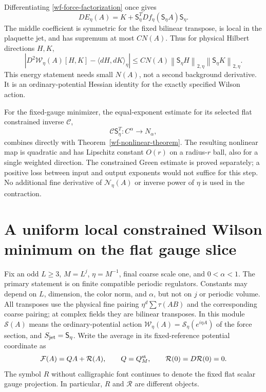 \documentclass[11pt]{article}
\theoremstyle{remark}
\newcommand{\norm}[1]{\left\|#1\right\|}
\begin{document}
Differentiating \eqref{wf-force-factorization} once gives
\begin{equation}\label{wf-energy-Hessian}
 DE_\eta(A)=K+\mathsf S_\eta^T
                Df_\eta(\mathsf S_\eta A)\mathsf S_\eta.
\end{equation}
The middle coefficient is symmetric for the fixed bilinear
transpose, is local in the plaquette jet, and has supremum
at most $CN(A)$. Thus for physical Hilbert directions $H,K$,
\begin{equation}\label{wf-energy-form}
 \left|D^2\mathcal W_\eta(A)[H,K]
                         -\langle dH,dK\rangle_\eta\right|
 \le CN(A)\norm{\mathsf S_\eta H}_{2,\eta}
                         \norm{\mathsf S_\eta K}_{2,\eta}.
\end{equation}
This energy statement needs small $N(A)$, not a second
background derivative. It is an ordinary-potential
Hessian identity for the exactly specified Wilson action.

For the fixed-gauge minimizer, the equal-exponent estimate
for its selected flat constrained inverse $\mathcal C$,
\[
 \mathcal C\mathsf S_\eta^T:C^\alpha\longrightarrow N_\alpha,
\]
combines directly with Theorem~\ref{wf-nonlinear-theorem}.
The resulting nonlinear map is quadratic and has
Lipschitz constant $O(r)$ on a radius-$r$ ball, also for
a single weighted direction. The constrained Green estimate
is proved separately; a positive loss between input and
output exponents would not suffice for this step. No
additional fine derivative of $\mathcal N_\eta(A)$ or
inverse power of $\eta$ is used in the contraction.


\section{A uniform local constrained Wilson minimum on the flat gauge slice}
\label{nm-section}

Fix an odd $L\ge3$, $M=L^j$, $\eta=M^{-1}$, final coarse scale one,
and $0<\alpha<1$. The primary statement is on finite compatible
periodic regulators. Constants may depend on $L$, dimension, the
color norm, and $\alpha$, but not on $j$ or periodic volume. All
transposes use the physical fine pairing $\eta^d\sum\tau(AB)$ and
the corresponding coarse pairing; at complex fields they are
bilinear transposes. In this module
$\mathcal S(A)$ means the ordinary-potential action
$\mathcal W_\eta(A)=\mathcal S_\eta(e^{i\eta A})$ of the force
section, and $S_{\rm jet}=\mathsf S_\eta$. Write the average in its
fixed-reference potential coordinate as
\begin{equation}\label{nm-average}
 \mathcal F(A)=QA+\mathcal R(A),\qquad Q=Q_M^{\rm st},\qquad
 \mathcal R(0)=D\mathcal R(0)=0.
\end{equation}
The symbol $R$ without calligraphic font continues to denote the
fixed flat scalar gauge projection. In particular, $R$ and
$\mathcal R$ are different objects.
\end{document}
